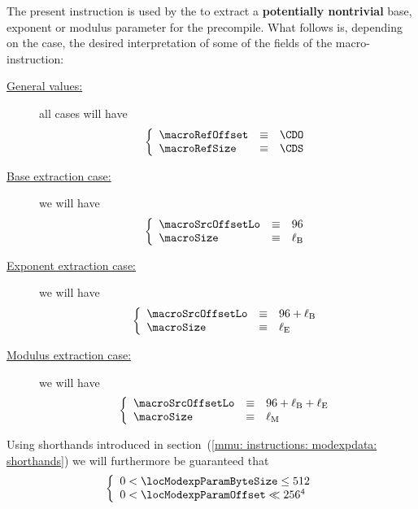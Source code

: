 The present instruction is used by the \hubMod{} to extract a \textbf{potentially nontrivial} base, exponent or modulus parameter for the \instModexp{} precompile.
What follows is, depending on the case, the desired interpretation of some of the fields of the macro-instruction:
\begin{description}
	\item[\underline{General values:}]
		all cases will have
		\[
			\left\{ \begin{array}{lcl}
				\macroRefOffset  & \equiv & \CDO \\
				\macroRefSize    & \equiv & \CDS \\
			\end{array} \right.
		\]
	\item[\underline{Base extraction case:}] 
		we will have
		\[
			\left\{ \begin{array}{lcl}
				\macroSrcOffsetLo  & \equiv & 96            \\
				\macroSize         & \equiv & \ell_\text{B} \\
			\end{array} \right.
		\]
	\item[\underline{Exponent extraction case:}] 
		we will have
		\[
			\left\{ \begin{array}{lcl}
				\macroSrcOffsetLo  & \equiv & 96 + \ell_\text{B} \\
				\macroSize         & \equiv & \ell_\text{E}      \\
			\end{array} \right.
		\]
	\item[\underline{Modulus extraction case:}] 
		we will have
		\[
			\left\{ \begin{array}{lcl}
				\macroSrcOffsetLo  & \equiv & 96 + \ell_\text{B} + \ell_\text{E} \\
				\macroSize         & \equiv & \ell_\text{M}                      \\
			\end{array} \right.
		\]
\end{description}
Using shorthands introduced in section~(\ref{mmu: instructions: modexpdata: shorthands}) we will furthermore be guaranteed that
\[
	\left\{ \begin{array}{l}
		0 < \locModexpParamByteSize \leq 512    \\
		0 < \locModexpParamOffset        \ll 256^4 \\
	\end{array} \right.
\]
